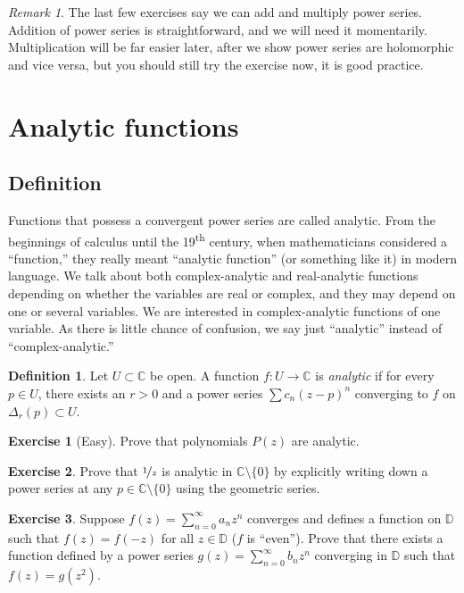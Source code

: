 \documentclass[12pt,openany]{book}
\newcommand{\C}{{\mathbb{C}}}
\newcommand{\D}{{\mathbb{D}}}
\newcommand{\myindex}[1]{#1\index{#1}}
\newcommand{\myquote}[1]{``#1''}
\theoremstyle{plain}
\theoremstyle{remark}
\newtheorem{remark}[thm]{Remark}
\theoremstyle{definition}
\newtheorem{defn}[thm]{Definition}
\newenvironment{exbox}{%
    \def\FrameCommand{\vrule width 1pt \relax\hspace{10pt}}%
    \MakeFramed{\advance\hsize-\width\FrameRestore}%
}{%
    \endMakeFramed
}
\theoremstyle{exercise}
\newtheorem{exercise}{Exercise}[section]
\theoremstyle{example}
\begin{document}
\begin{remark}
The last few exercises say we can add and multiply power series.
Addition of power series is straightforward, and we will need it momentarily.
Multiplication will be far easier later, after
we show power series are
holomorphic and vice versa, but you should still try the exercise now, it is good
practice.
\end{remark}


\section{Analytic functions}
\label{sec:analfuncs}

\subsection{Definition}

Functions that possess a convergent power series are called analytic.
From the beginnings of calculus until the 19\textsuperscript{th} century, 
when mathematicians considered a \myquote{function,} they really meant
\myquote{analytic function} (or something like it) in modern language.
We talk about
both complex-analytic and real-analytic functions depending on whether the
variables are real or complex, and they may depend on one or several variables.
We are interested in complex-analytic functions of one variable. 
As there is little chance of confusion, we say just \myquote{analytic} instead of
\myquote{complex-analytic.}

\begin{defn}
Let $U \subset \C$ be open.  A function $f \colon U \to \C$
is \emph{\myindex{analytic}}
if for every $p \in U$, there exists 
an $r > 0$ and a
power series $\sum c_n {(z-p)}^n$ converging to $f$ on $\Delta_r(p) \subset
U$.
\end{defn}

\begin{exbox}
\begin{exercise}[Easy]
Prove that polynomials $P(z)$ are analytic.
\end{exercise}

\begin{exercise}
Prove that $\nicefrac{1}{z}$ is analytic in $\C \setminus \{ 0 \}$
by explicitly writing down 
a power series at any $p \in \C \setminus \{ 0 \}$
using the geometric series.
\end{exercise}

\begin{exercise}
Suppose $f(z) = \sum_{n=0}^\infty a_n z^n$ converges and defines a
function on $\D$ such that $f(z) = f(-z)$ for all $z \in \D$ ($f$ is
\myquote{even}).
Prove that there exists a function defined by a power series
$g(z) = \sum_{n=0}^\infty b_n z^n$ converging in $\D$ such that
$f(z) = g(z^2)$.
\end{exercise}
\end{exbox}
\end{document}
